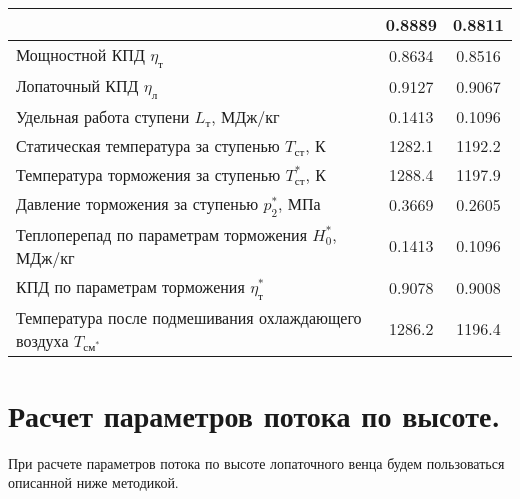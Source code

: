 \documentclass[a4paper,10pt]{article}
\begin{document}
\begin{longtable}{
    |p{8cm}|
%    
    c|
%    
    c|
%    
    }
%        
        & 0.8889
%        
        & 0.8811
%        
        \\ \hline
        Мощностной КПД $\eta_т$
%        
        & 0.8634
%        
        & 0.8516
%        
        \\ \hline
        Лопаточный КПД $\eta_л$
%        
        & 0.9127
%        
        & 0.9067
%        
        \\ \hline
        Удельная работа ступени $L_т$, МДж/кг
%        
        & 0.1413
%        
        & 0.1096
%        
        \\ \hline
        Статическая температура за ступенью $T_{ст}$, К
%        
        & 1282.1
%        
        & 1192.2
%        
        \\ \hline
        Температура торможения за ступенью $T_{ст}^*$, К
%        
        & 1288.4
%        
        & 1197.9
%        
        \\ \hline
        Давление торможения за ступенью $p_2^*$, МПа
%        
        & 0.3669
%        
        & 0.2605
%        
        \\ \hline
        Теплоперепад по параметрам торможения $H_0^*$, МДж/кг
%        
        & 0.1413
%        
        & 0.1096
%        
        \\ \hline
        КПД по параметрам торможения $\eta_т^*$
%        
        & 0.9078
%        
        & 0.9008
%        
        \\ \hline
        Температура после подмешивания охлаждающего воздуха $T_{см^*}$
%        
        & 1286.2
%        
        & 1196.4
%        
        \\ \hline
    \end{longtable}
    

    \section{Расчет параметров потока по высоте.}

    

    При расчете параметров потока по высоте лопаточного венца будем пользоваться описанной ниже методикой.
\end{document}
